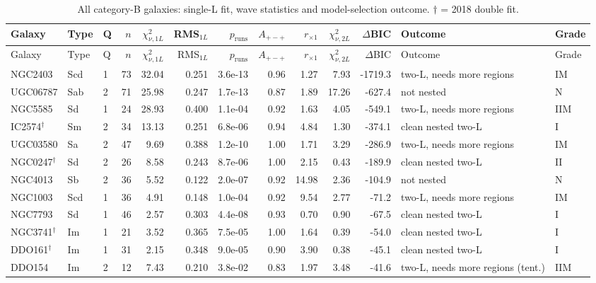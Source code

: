 \documentclass[10pt]{article}
\begin{document}
\clearpage\begin{landscape}{\scriptsize\setlength{\tabcolsep}{3pt}
\begin{longtable}{lllrrrrrrrrll}
\caption{All category-B galaxies: single-L fit, wave statistics and model-selection outcome. $\dagger$ = 2018 double fit.}\\\toprule
Galaxy & Type & Q & $n$ & $\chi^2_{\nu,1L}$ & RMS$_{1L}$ & $p_\mathrm{runs}$ & $A_{+-+}$ & $r_{\times1}$ & $\chi^2_{\nu,2L}$ & $\Delta$BIC & Outcome & Grade\\\midrule\endfirsthead
\toprule Galaxy & Type & Q & $n$ & $\chi^2_{\nu,1L}$ & RMS$_{1L}$ & $p_\mathrm{runs}$ & $A_{+-+}$ & $r_{\times1}$ & $\chi^2_{\nu,2L}$ & $\Delta$BIC & Outcome & Grade\\\midrule\endhead\bottomrule\endfoot
NGC2403 & Scd & 1 & 73 & 32.04 & 0.251 & 3.6e-13 & 0.96 & 1.27 & 7.93 & -1719.3 & two-L, needs more regions & IM\\
UGC06787 & Sab & 2 & 71 & 25.98 & 0.247 & 1.7e-13 & 0.87 & 1.89 & 17.26 & -627.4 & not nested & N\\
NGC5585 & Sd & 1 & 24 & 28.93 & 0.400 & 1.1e-04 & 0.92 & 1.63 & 4.05 & -549.1 & two-L, needs more regions & IIM\\
IC2574$^\dagger$ & Sm & 2 & 34 & 13.13 & 0.251 & 6.8e-06 & 0.94 & 4.84 & 1.30 & -374.1 & clean nested two-L & I\\
UGC03580 & Sa & 2 & 47 & 9.69 & 0.388 & 1.2e-10 & 1.00 & 1.71 & 3.29 & -286.9 & two-L, needs more regions & IM\\
NGC0247$^\dagger$ & Sd & 2 & 26 & 8.58 & 0.243 & 8.7e-06 & 1.00 & 2.15 & 0.43 & -189.9 & clean nested two-L & II\\
NGC4013 & Sb & 2 & 36 & 5.52 & 0.122 & 2.0e-07 & 0.92 & 14.98 & 2.36 & -104.9 & not nested & N\\
NGC1003 & Scd & 1 & 36 & 4.91 & 0.148 & 1.0e-04 & 0.92 & 9.54 & 2.77 & -71.2 & two-L, needs more regions & IM\\
NGC7793 & Sd & 1 & 46 & 2.57 & 0.303 & 4.4e-08 & 0.93 & 0.70 & 0.90 & -67.5 & clean nested two-L & I\\
NGC3741$^\dagger$ & Im & 1 & 21 & 3.52 & 0.365 & 7.5e-05 & 1.00 & 1.64 & 0.39 & -54.0 & clean nested two-L & I\\
DDO161$^\dagger$ & Im & 1 & 31 & 2.15 & 0.348 & 9.0e-05 & 0.90 & 3.90 & 0.38 & -45.1 & clean nested two-L & I\\
DDO154 & Im & 2 & 12 & 7.43 & 0.210 & 3.8e-02 & 0.83 & 1.97 & 3.48 & -41.6 & two-L, needs more regions (tent.) & IIM\\

\end{longtable}}
\end{landscape}
\end{document}
